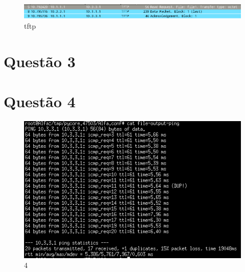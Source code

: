 \documentclass[a4paper]{report}
\begin{document}
\begin{figure}[H]
    \centering 
    \includegraphics[width=\textwidth]{images/2tftp.png}  
    \caption{tftp}
    \label{fig:2tft:}
\end{figure}

\chapter{Questão 3}


\chapter{Questão 4}
\begin{figure}[H]
    \centering 
    \includegraphics[width=\textwidth]{images/4.png}  
    \caption{4}
    \label{fig:4}
\end{figure}
\end{document}
